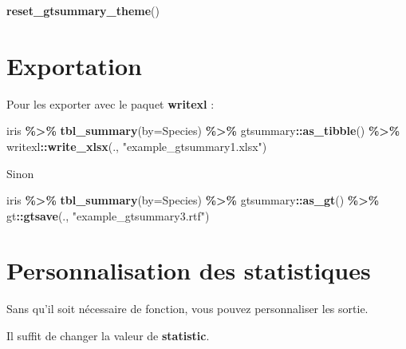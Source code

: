 \documentclass[
]{book}
\newenvironment{Shaded}{\begin{snugshade}}{\end{snugshade}}
\newcommand{\AttributeTok}[1]{\textcolor[rgb]{0.13,0.29,0.53}{#1}}
\newcommand{\FunctionTok}[1]{\textcolor[rgb]{0.13,0.29,0.53}{\textbf{#1}}}
\newcommand{\NormalTok}[1]{#1}
\newcommand{\SpecialCharTok}[1]{\textcolor[rgb]{0.81,0.36,0.00}{\textbf{#1}}}
\newcommand{\StringTok}[1]{\textcolor[rgb]{0.31,0.60,0.02}{#1}}
\begin{document}
\begin{Shaded}
\begin{Highlighting}[]
\FunctionTok{reset\_gtsummary\_theme}\NormalTok{()}
\end{Highlighting}
\end{Shaded}

\hypertarget{exportation}{%
\section{Exportation}\label{exportation}}

Pour les exporter avec le paquet \textbf{writexl} :

\begin{Shaded}
\begin{Highlighting}[]
\NormalTok{iris }\SpecialCharTok{\%\textgreater{}\%} \FunctionTok{tbl\_summary}\NormalTok{(}\AttributeTok{by=}\NormalTok{Species) }\SpecialCharTok{\%\textgreater{}\%}
\NormalTok{  gtsummary}\SpecialCharTok{::}\FunctionTok{as\_tibble}\NormalTok{() }\SpecialCharTok{\%\textgreater{}\%} 
\NormalTok{  writexl}\SpecialCharTok{::}\FunctionTok{write\_xlsx}\NormalTok{(., }\StringTok{"example\_gtsummary1.xlsx"}\NormalTok{)}
\end{Highlighting}
\end{Shaded}

Sinon

\begin{Shaded}
\begin{Highlighting}[]
\NormalTok{iris }\SpecialCharTok{\%\textgreater{}\%} \FunctionTok{tbl\_summary}\NormalTok{(}\AttributeTok{by=}\NormalTok{Species) }\SpecialCharTok{\%\textgreater{}\%}
\NormalTok{  gtsummary}\SpecialCharTok{::}\FunctionTok{as\_gt}\NormalTok{() }\SpecialCharTok{\%\textgreater{}\%} 
\NormalTok{  gt}\SpecialCharTok{::}\FunctionTok{gtsave}\NormalTok{(., }\StringTok{"example\_gtsummary3.rtf"}\NormalTok{)}
\end{Highlighting}
\end{Shaded}

\hypertarget{personnalisation-des-statistiques}{%
\section{Personnalisation des statistiques}\label{personnalisation-des-statistiques}}

Sans qu'il soit nécessaire de fonction, vous pouvez personnaliser les sortie.

Il suffit de changer la valeur de \textbf{statistic}.
\end{document}
